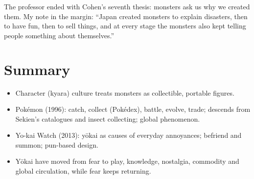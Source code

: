 \begin{aside}
The professor ended with Cohen's seventh thesis: monsters ask us why we created them. My
note in the margin: ``Japan created monsters to explain disasters, then to have fun, then
to sell things, and at every stage the monsters also kept telling people something about
themselves.''
\end{aside}

\section*{Summary}
\begin{itemize}
  \item Character (kyara) culture treats monsters as collectible, portable figures.
  \item Pokémon (1996): catch, collect (Pokédex), battle, evolve, trade; descends from
        Sekien's catalogues and insect collecting; global phenomenon.
  \item Yo-kai Watch (2013): yōkai as causes of everyday annoyances; befriend and summon;
        pun-based design.
  \item Yōkai have moved from fear to play, knowledge, nostalgia, commodity and global
        circulation, while fear keeps returning.
\end{itemize}
